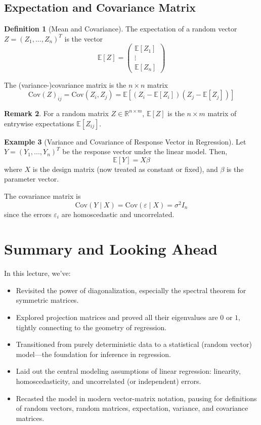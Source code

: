 \documentclass[11pt]{article}
\theoremstyle{definition}
\newtheorem{definition}{Definition}[section]
\theoremstyle{plain}
\theoremstyle{definition}
\newtheorem{example}[definition]{Example}
\newtheorem{remark}[definition]{Remark}
\begin{document}
\subsection{Expectation and Covariance Matrix}

\begin{definition}[Mean and Covariance]
The expectation of a random vector $Z=(Z_1, ..., Z_n)^T$ is the vector
\[
\mathbb{E}[Z] = 
\begin{pmatrix}
\mathbb{E}[Z_1] \\
\vdots \\
\mathbb{E}[Z_n]
\end{pmatrix}
\]

The (variance-)covariance matrix is the $n \times n$ matrix
\[
\mathrm{Cov}(Z)_{ij} = \mathrm{Cov}(Z_i, Z_j) = \mathbb{E}[(Z_i - \mathbb{E}[Z_i])(Z_j - \mathbb{E}[Z_j])]
\]
\end{definition}

\begin{remark}
For a random matrix $Z \in \mathbb{R}^{n \times m}$, $\mathbb{E}[Z]$ is the $n \times m$ matrix of entrywise expectations $\mathbb{E}[Z_{ij}]$.
\end{remark}

\begin{example}[Variance and Covariance of Response Vector in Regression]
Let $Y = (Y_1, ..., Y_n)^T$ be the response vector under the linear model. Then,
\[
\mathbb{E}[Y] = X\beta
\]
where $X$ is the design matrix (now treated as constant or fixed), and $\beta$ is the parameter vector.

The covariance matrix is
\[
\mathrm{Cov}(Y \mid X) = \mathrm{Cov}(\varepsilon \mid X) = \sigma^2 I_n
\]
since the errors $\varepsilon_i$ are homoscedastic and uncorrelated.
\end{example}

\section{Summary and Looking Ahead}

In this lecture, we've:
\begin{itemize}
    \item Revisited the power of diagonalization, especially the spectral theorem for symmetric matrices.
    \item Explored projection matrices and proved all their eigenvalues are $0$ or $1$, tightly connecting to the geometry of regression.
    \item Transitioned from purely deterministic data to a statistical (random vector) model—the foundation for inference in regression.
    \item Laid out the central modeling assumptions of linear regression: linearity, homoscedasticity, and uncorrelated (or independent) errors.
    \item Recasted the model in modern vector-matrix notation, pausing for definitions
      of random vectors, random matrices, expectation, variance, and covariance matrices.
\end{itemize}
\end{document}
